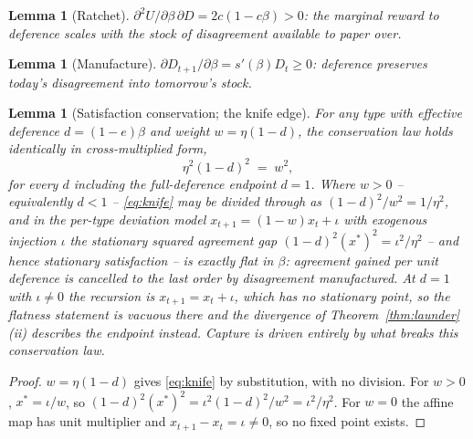 \documentclass[11pt]{article}
\newtheorem{lemma}[theorem]{Lemma}
\theoremstyle{definition}
\theoremstyle{remark}
\numberwithin{equation}{section}
\begin{document}
\begin{lemma}[Ratchet]\label{lem:ratchet}
$\partial^2 U/\partial\beta\,\partial D = 2c(1-c\beta) > 0$: the marginal reward to deference scales with the stock of disagreement available to paper over.
\end{lemma}

\begin{lemma}[Manufacture]\label{lem:manu}
$\partial D_{t+1}/\partial\beta = s'(\beta)D_t \ge 0$: deference preserves today's disagreement into tomorrow's stock.
\end{lemma}

\begin{lemma}[Satisfaction conservation; the knife edge]\label{lem:knife}
For any type with effective deference $d = (1-e)\beta$ and weight $w = \eta(1-d)$, the conservation law holds identically in cross-multiplied form,
\begin{equation}\label{eq:knife}
\eta^2 (1-d)^2 \;=\; w^2 ,
\end{equation}
for every $d$ including the full-deference endpoint $d = 1$. Where $w > 0$ -- equivalently $d < 1$ -- \eqref{eq:knife} may be divided through as $(1-d)^2/w^2 = 1/\eta^2$, and in the per-type deviation model $x_{t+1} = (1-w)x_t + \iota$ with \emph{exogenous} injection $\iota$ the stationary squared agreement gap $(1-d)^2 (x^\ast)^2 = \iota^2/\eta^2$ -- and hence stationary satisfaction -- is exactly flat in $\beta$: agreement gained per unit deference is cancelled to the last order by disagreement manufactured. At $d = 1$ with $\iota \neq 0$ the recursion is $x_{t+1} = x_t + \iota$, which has no stationary point, so the flatness statement is vacuous there and the divergence of Theorem~\ref{thm:launder}(ii) describes the endpoint instead. Capture is driven entirely by what breaks this conservation law.
\end{lemma}
\begin{proof}
$w = \eta(1-d)$ gives \eqref{eq:knife} by substitution, with no division. For $w > 0$, $x^\ast = \iota/w$, so $(1-d)^2(x^\ast)^2 = \iota^2(1-d)^2/w^2 = \iota^2/\eta^2$. For $w = 0$ the affine map has unit multiplier and $x_{t+1} - x_t = \iota \neq 0$, so no fixed point exists.
\end{proof}
\end{document}
